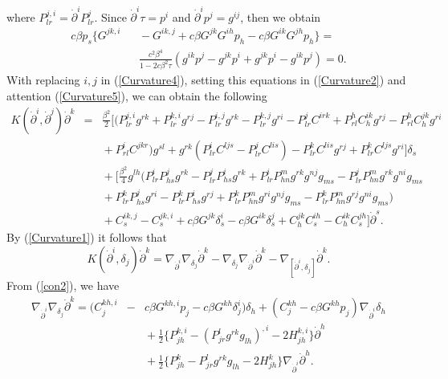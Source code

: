 \documentclass[10pt,a4paper]{article}
\theoremstyle{plain}
\theoremstyle{definition}
\begin{document}
where $P^{j,i}_{lr}={\dot{\partial}}^iP^j_{lr}$. Since
${\dot{\partial}}^i\tau=p^i$ and ${\dot{\partial}}^ip^j=g^{ij}$,
then we obtain
\begin{eqnarray}
c\beta p_s\{G^{jk,i}\!\!\!\!&&\!\!\!\!-G^{ik,j}+c\beta G^{jk}G^{ih}p_h-c\beta G^{ik}G^{jh}p_h\}=\nonumber\\
\!\!\!\!&&\!\!\!\!\frac{c^2\beta^4}{1-2c\beta^2\tau}(g^{ik}p^j-g^{jk}p^i+g^{jk}p^i-g^{ik}p^j)=0.\label{Curvature5}
\end{eqnarray}
With replacing  $i,j$ in (\ref{Curvature4}), setting this equations
in (\ref{Curvature2}) and attention (\ref{Curvature5}), we can obtain the following
\begin{eqnarray}
K({\dot{\partial}}^i,{\dot{\partial}}^j){\dot{\partial}}^k\!\!\!\!&=&\!\!\!\!
\frac{\beta^2}{2}\Big[(P^{j,i}_{lr}g^{rk}+P^{k,i}_{lr}g^{rj}-P^{i,j}_{lr}g^{rk}
-P^{k,j}_{lr}g^{ri}-P^j_{lr}C^{irk}+P^h_{rl}C^{ik}_hg^{rj}-P^h_{rl}C^{jk}_hg^{ri}
\nonumber\\
\!\!\!\!&&\!\!\!\!+P^i_{rl}C^{jkr})g^{sl}
+g^{rk}(P^i_{lr}C^{ljs}-P^j_{lr}C^{lis})-P^k_{lr}C^{lis}g^{rj}
+P^k_{lr}C^{ljs}g^{ri}\Big]\delta_s\nonumber\\
\!\!\!\!&&\!\!\!\!
+\Big[\frac{\beta^2}{4}g^{lh}\big(P^i_{lr}P^j_{hs}g^{rk}-P^j_{lr}P^i_{hs}g^{rk}
+P^i_{lr}P^m_{hn}g^{rk}g^{nj}g_{ms}-P^j_{lr}P^m_{hn}g^{rk}g^{ni}g_{ms}\nonumber\\
\!\!\!\!&&\!\!\!\!+P^k_{lr}P^j_{hs}g^{ri}-P^k_{lr}P^i_{hs}g^{rj}
+P^k_{lr}P^m_{hn}g^{ri}g^{nj}g_{ms}-P^k_{lr}P^m_{hn}g^{rj}g^{ni}g_{ms}\big)\nonumber\\
\!\!\!\!&&\!\!\!\!+C^{ik,j}_s-C^{jk,i}_s+c\beta G^{jk}\delta^i_s-c\beta G^{ik}\delta^j_s+C^{jk}_hC^{ih}_s
-C^{ik}_hC^{jh}_s\Big]{\dot{\partial}}^s.\label{Curvature6}
\end{eqnarray}
By  (\ref{Curvature1}) it follows that
\begin{equation}
K({\dot{\partial}}^i,\delta_j){\dot{\partial}}^k={\nabla
}_{{\dot{\partial}}^i} {\nabla
}_{\delta_j}{\dot{\partial}}^k-{\nabla }_{\delta_j}{\nabla
}_{{\dot{\partial}}^i}{\dot{\partial}}^k-\nabla_{[{\dot{\partial}}^i,\delta_j]}{\dot{\partial}}^k.\label{Curvature7}
\end{equation}
From (\ref{con2}), we have
\begin{eqnarray}
{\nabla }_{{\dot{\partial}}^i}{\nabla
}_{\delta_j}{\dot{\partial}}^k=(C^{kh,i}_j\!\!\!\!&-&\!\!\!\!c\beta
G^{kh,i}p_j-c\beta G^{kh}\delta^i_j)\delta_h+(C^{kh}_j-c\beta
G^{kh}p_j)\nabla_{{\dot{\partial}}^i}\delta_h\nonumber\\
\!\!\!\!&&\!\!\!\!+\frac{1}{2}\{P^{k,i}_{jh}-(P^l_{jr}g^{rk}g_{lh})^{,i}-2H^{k,i}_{jh}\}{\dot{\partial}}^h
\nonumber\\
\!\!\!\!&&\!\!\!\!+\frac{1}{2}\{P^k_{jh}-P^l_{jr}g^{rk}g_{lh}-2H^k_{jh}\}
\nabla_{{\dot{\partial}}^i}{\dot{\partial}}^h.\label{Curvature8}
\end{eqnarray}
\end{document}
